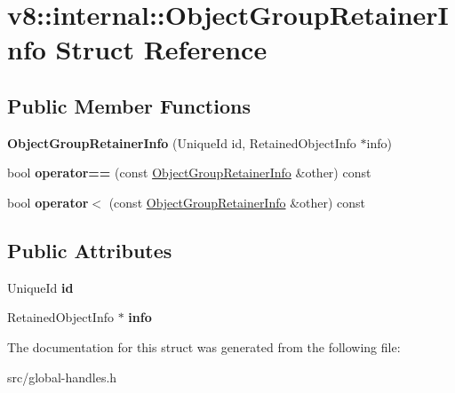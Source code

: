 \hypertarget{structv8_1_1internal_1_1_object_group_retainer_info}{}\section{v8\+:\+:internal\+:\+:Object\+Group\+Retainer\+Info Struct Reference}
\label{structv8_1_1internal_1_1_object_group_retainer_info}
\subsection*{Public Member Functions}
\begin{DoxyCompactItemize}
\item 
\hypertarget{structv8_1_1internal_1_1_object_group_retainer_info_affe1484c03d628b2d44c5b6caef29eb5}{}{\bfseries Object\+Group\+Retainer\+Info} (Unique\+Id id, Retained\+Object\+Info $\ast$info)\label{structv8_1_1internal_1_1_object_group_retainer_info_affe1484c03d628b2d44c5b6caef29eb5}

\item 
\hypertarget{structv8_1_1internal_1_1_object_group_retainer_info_a98c0d397f74c8245181d3264d7091b37}{}bool {\bfseries operator==} (const \hyperlink{structv8_1_1internal_1_1_object_group_retainer_info}{Object\+Group\+Retainer\+Info} \&other) const \label{structv8_1_1internal_1_1_object_group_retainer_info_a98c0d397f74c8245181d3264d7091b37}

\item 
\hypertarget{structv8_1_1internal_1_1_object_group_retainer_info_a0f34adbbd7459fbf50b5d647b73623f1}{}bool {\bfseries operator$<$} (const \hyperlink{structv8_1_1internal_1_1_object_group_retainer_info}{Object\+Group\+Retainer\+Info} \&other) const \label{structv8_1_1internal_1_1_object_group_retainer_info_a0f34adbbd7459fbf50b5d647b73623f1}

\end{DoxyCompactItemize}
\subsection*{Public Attributes}
\begin{DoxyCompactItemize}
\item 
\hypertarget{structv8_1_1internal_1_1_object_group_retainer_info_a65a452da20b8166b0638de0a7e3e71f4}{}Unique\+Id {\bfseries id}\label{structv8_1_1internal_1_1_object_group_retainer_info_a65a452da20b8166b0638de0a7e3e71f4}

\item 
\hypertarget{structv8_1_1internal_1_1_object_group_retainer_info_a7476c3c666becd9545211a3fd5a0de2a}{}Retained\+Object\+Info $\ast$ {\bfseries info}\label{structv8_1_1internal_1_1_object_group_retainer_info_a7476c3c666becd9545211a3fd5a0de2a}

\end{DoxyCompactItemize}


The documentation for this struct was generated from the following file\+:\begin{DoxyCompactItemize}
\item 
src/global-\/handles.\+h\end{DoxyCompactItemize}
